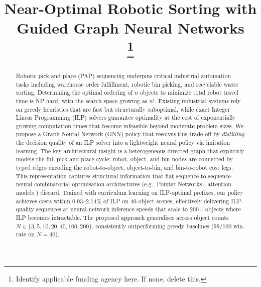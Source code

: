 \documentclass[conference]{IEEEtran}
\begin{document}
\title{\textbf{Near-Optimal Robotic Sorting with Guided Graph Neural Networks}\\
\thanks{Identify applicable funding agency here. If none, delete this.}
}

\author{
\and
{}
\and
{}
}

\maketitle

\begin{abstract}
Robotic pick-and-place (PAP) sequencing underpins critical industrial automation tasks including warehouse order fulfillment, robotic bin picking, and recyclable waste sorting. Determining the optimal ordering of $n$ objects to minimize total robot travel time is NP-hard, with the search space growing as $n!$. Existing industrial systems rely on greedy heuristics that are fast but structurally suboptimal, while exact Integer Linear Programming (ILP) solvers guarantee optimality at the cost of exponentially growing computation times that become infeasible beyond moderate problem sizes. We propose a Graph Neural Network (GNN) policy that resolves this trade-off by \emph{distilling} the decision quality of an ILP solver into a lightweight neural policy via imitation learning. The key architectural insight is a heterogeneous directed graph that explicitly models the full pick-and-place cycle: robot, object, and bin nodes are connected by typed edges encoding the robot-to-object, object-to-bin, and bin-to-robot cost legs. This representation captures structural information that flat sequence-to-sequence neural combinatorial optimisation architectures (e.g., Pointer Networks \cite{vinyals2015pointer}, attention models \cite{kool2019attention}) discard. Trained with curriculum learning on ILP-optimal prefixes, our policy achieves costs within 0.03--2.14\% of ILP on 40-object scenes, effectively delivering ILP-quality sequences at neural-network inference speeds that scale to 200+ objects where ILP becomes intractable. The proposed approach generalises across object counts $N \in \{3, 5, 10, 20, 40, 100, 200\}$, consistently outperforming greedy baselines (99/100 win-rate on $N{=}40$).
\end{abstract}
\end{document}
